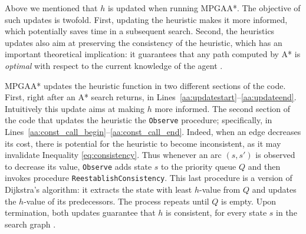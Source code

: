 \documentclass{article}
\begin{document}
Above we mentioned that $h$ is updated when running MPGAA*.
The objective of such updates is twofold. First, updating the heuristic makes it more informed, which potentially saves time in a subsequent search. Second, the heuristics updates also aim at preserving the consistency of the heuristic, which has an important theoretical implication: it guarantees that any path computed by A* is \emph{optimal} with respect to the current knowledge of the agent \cite{SunKY08,HernandezAB15}.

MPGAA* updates the heuristic function in two different sections of the code. First, right after an A* search returns, in Lines~\ref{aa:updatestart}--\ref{aa:updateend}. Intuitively this update aims at making $h$ more informed. %
The second section of the code that updates the heuristic the \texttt{Observe} procedure; specifically, in Lines~\ref{aa:const_call_begin}--\ref{aa:const_call_end}. Indeed, when an edge decreases its cost, there is potential for the heuristic to become inconsistent, as it may invalidate Inequality \eqref{eq:consistency}. Thus whenever an arc $(s,s')$ is observed to decrease its value, \texttt{Observe} adds state $s$ to the priority queue $Q$ and then invokes procedure \texttt{ReestablishConsistency}. This last procedure is a version of Dijkstra's algorithm: it extracts the state with least $h$-value from $Q$ and updates the $h$-value of its predecessors. The process repeats until $Q$ is empty. Upon termination, both updates guarantee that $h$ is consistent, for every state $s$ in the search graph \cite{SunKY08}.


\end{document}
